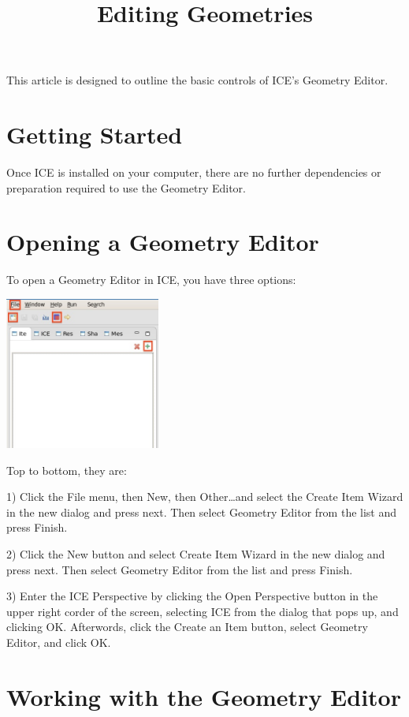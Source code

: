 \documentclass{article}
\begin{document}
\title{Editing Geometries}

This article is designed to outline the basic controls of ICE's Geometry Editor.

\section{Getting Started}

Once ICE is installed on your computer, there are no further dependencies or
preparation required to use the Geometry Editor.

\section{Opening a Geometry Editor}

To open a Geometry Editor in ICE, you have three options:

\begin{center}
\includegraphics[height=5cm]{images/CreateNewMeshOptions.jpg}
\end{center}

Top to bottom, they are:

1) Click the File menu, then New, then Other\ldots and select the Create Item
Wizard in the new dialog and press next. Then select Geometry Editor from the
list and press Finish.

 
2) Click the New button and select Create Item Wizard in the new dialog and
press next. Then select Geometry Editor from the list and press Finish.


3) Enter the ICE Perspective by clicking the Open Perspective button in the
upper right corder of the screen, selecting ICE from the dialog that pops up,
and clicking OK. Afterwords, click the Create an Item button, select
Geometry Editor, and click OK.

\section{Working with the Geometry Editor}
\end{document}
